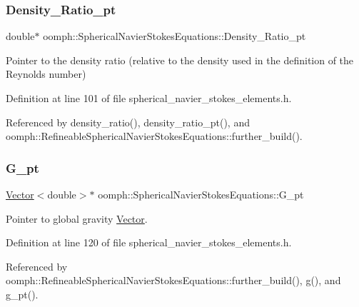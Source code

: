 \subsubsection{\texorpdfstring{Density\+\_\+\+Ratio\+\_\+pt}{Density\_Ratio\_pt}}
{\footnotesize\ttfamily double$\ast$ oomph\+::\+Spherical\+Navier\+Stokes\+Equations\+::\+Density\+\_\+\+Ratio\+\_\+pt\hspace{0.3cm}{\ttfamily [protected]}}



Pointer to the density ratio (relative to the density used in the definition of the Reynolds number) 



Definition at line 101 of file spherical\+\_\+navier\+\_\+stokes\+\_\+elements.\+h.



Referenced by density\+\_\+ratio(), density\+\_\+ratio\+\_\+pt(), and oomph\+::\+Refineable\+Spherical\+Navier\+Stokes\+Equations\+::further\+\_\+build().

\mbox{\label{classoomph_1_1SphericalNavierStokesEquations_a658fccedce092b905f74278e882e34f1}} 
\subsubsection{\texorpdfstring{G\+\_\+pt}{G\_pt}}
{\footnotesize\ttfamily \hyperlink{classoomph_1_1Vector}{Vector}$<$double$>$$\ast$ oomph\+::\+Spherical\+Navier\+Stokes\+Equations\+::\+G\+\_\+pt\hspace{0.3cm}{\ttfamily [protected]}}



Pointer to global gravity \hyperlink{classoomph_1_1Vector}{Vector}. 



Definition at line 120 of file spherical\+\_\+navier\+\_\+stokes\+\_\+elements.\+h.



Referenced by oomph\+::\+Refineable\+Spherical\+Navier\+Stokes\+Equations\+::further\+\_\+build(), g(), and g\+\_\+pt().

\mbox{\label{classoomph_1_1SphericalNavierStokesEquations_a46db5472cddbf25175670ef6298cbe51}} 
